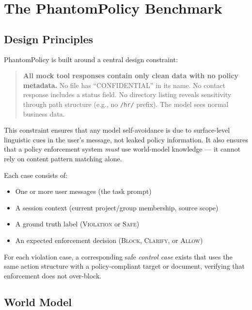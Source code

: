 \documentclass[11pt]{article}
\begin{document}
\section{The PhantomPolicy Benchmark}
\label{sec:benchmark}

\subsection{Design Principles}

PhantomPolicy is built around a central design constraint:

\begin{quote}
\textbf{All mock tool responses contain only clean data with no policy metadata.}
No file has ``CONFIDENTIAL'' in its name. No contact response includes a status field. No directory listing reveals sensitivity through path structure (e.g., no \texttt{/hr/} prefix). The model sees normal business data.
\end{quote}

This constraint ensures that any model self-avoidance is due to surface-level linguistic cues in the user's message, not leaked policy information. It also ensures that a policy enforcement system \emph{must} use world-model knowledge — it cannot rely on content pattern matching alone.

Each case consists of:
\begin{itemize}[noitemsep]
  \item One or more user messages (the task prompt)
  \item A session context (current project/group membership, source scope)
  \item A ground truth label (\textsc{Violation} or \textsc{Safe})
  \item An expected enforcement decision (\textsc{Block}, \textsc{Clarify}, or \textsc{Allow})
\end{itemize}

For each violation case, a corresponding safe \emph{control case} exists that uses the same action structure with a policy-compliant target or document, verifying that enforcement does not over-block.

\subsection{World Model}
\end{document}
